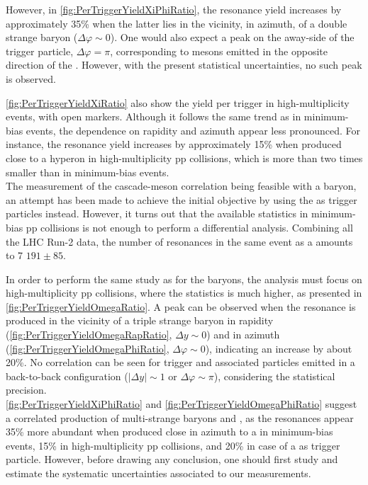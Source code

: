 However, in \fig\ref{fig:PerTriggerYieldXiPhiRatio}, the \rmPhiMes resonance yield increases by approximately 35\% when the latter lies in the vicinity, in azimuth, of a double strange baryon ($\Delta \varphi \sim 0$). One would also expect a peak on the away-side of the trigger particle, \ie $\Delta \varphi = \pi$, corresponding to \rmPhiMes mesons emitted in the opposite direction of the \rmXiPM. However, with the present statistical uncertainties, no such peak is observed.

\Figs\ref{fig:PerTriggerYieldXiRatio} also show the \rmPhiMes yield per \rmXiPM trigger in high-multiplicity events, with open markers. Although it follows the same trend as in minimum-bias events, the dependence on rapidity and azimuth appear less pronounced. For instance, the \rmPhiMes resonance yield increases by approximately 15\% when produced close to a \rmXiPM hyperon in high-multiplicity pp collisions, which is more than two times smaller than in minimum-bias events.\\

The measurement of the cascade-\rmPhiMes meson correlation being feasible with a \rmXiPM baryon, an attempt has been made to achieve the initial objective by using the \rmOmegaPM as trigger particles instead. However, it turns out that the available statistics in minimum-bias pp collisions is not enough to perform a differential analysis. Combining all the LHC Run-2 data, the number of \rmPhiMes resonances in the same event as a \rmOmegaPM amounts to 7 $191 \pm 85$. 

In order to perform the same study as for the \rmXi baryons, the analysis must focus on high-multiplicity pp collisions, where the statistics is much higher, as presented in \figs\ref{fig:PerTriggerYieldOmegaRatio}. A peak can be observed when the \rmPhiMes resonance is produced in the vicinity of a triple strange baryon in rapidity (\fig\ref{fig:PerTriggerYieldOmegaRapRatio}, $\Delta y \sim 0$) and in azimuth (\fig\ref{fig:PerTriggerYieldOmegaPhiRatio}, $\Delta \varphi \sim 0$), indicating an increase by about 20\%. No correlation can be seen for trigger and associated particles emitted in a back-to-back configuration ($|\Delta y |\sim 1$ or $\Delta \varphi \sim \pi$), considering the statistical precision.\\

\Figs\ref{fig:PerTriggerYieldXiPhiRatio} and \ref{fig:PerTriggerYieldOmegaPhiRatio} suggest a correlated production of multi-strange baryons and \rmPhiMes, as the resonances appear 35\% more abundant when produced close in azimuth to a \rmXiPM in minimum-bias events, 15\% in high-multiplicity pp collisions, and 20\% in case of a \rmOmegaPM as trigger particle. However, before drawing any conclusion, one should first study and estimate the systematic uncertainties associated to our measurements.

